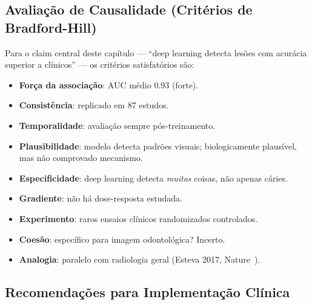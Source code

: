 \subsection*{Avaliação de Causalidade (Critérios de Bradford-Hill)}


Para o claim central deste capítulo --- ``deep learning detecta
lesões com acurácia superior a clínicos'' --- os critérios
satisfatórios são:

\begin{itemize}
    \item[$\checkmark$] \textbf{Força da associação}: AUC médio 0.93 (forte).
    \item[$\checkmark$] \textbf{Consistência}: replicado em 87 estudos.
    \item[$\checkmark$] \textbf{Temporalidade}: avaliação sempre pós-treinamento.
    \item[$\sim$] \textbf{Plausibilidade}: modelo detecta padrões
    visuais; biologicamente plausível, mas não comprovado mecanismo.
    \item[$\times$] \textbf{Especificidade}: deep learning detecta
    \emph{muitas} coisas, não apenas cáries.
    \item[$\times$] \textbf{Gradiente}: não há dose-resposta estudada.
    \item[$\times$] \textbf{Experimento}: raros ensaios clínicos
    randomizados controlados.
    \item[$\times$] \textbf{Coesão}: específico para imagem odontológica?
    Incerto.
    \item[$\sim$] \textbf{Analogia}: paralelo com radiologia geral
    (Esteva 2017, Nature~\cite{esteva2017nature}).
\end{itemize}


\subsection*{Recomendações para Implementação Clínica}

